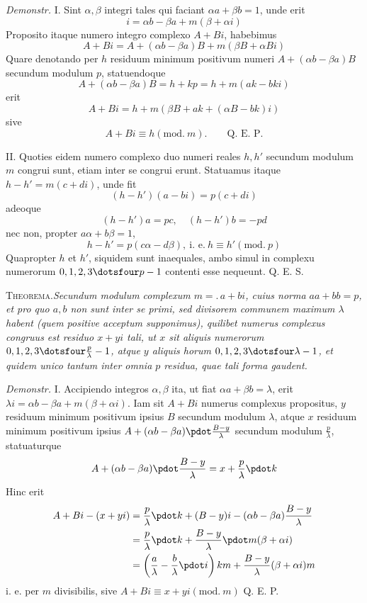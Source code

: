 %
\emph{Demonstr.} I. Sint $\alpha,\beta$ integri tales qui faciant $\alpha a+\beta b=1$, unde erit
\[
i=\alpha b-\beta a+m(\beta+\alpha i)
\]
Proposito itaque numero integro complexo $A+Bi$, habebimus
\[
A+Bi=A+(\alpha b-\beta a)B+m(\beta B+\alpha Bi)
\]
Quare denotando per $h$ residuum minimum positivum numeri $A+(\alpha b-\beta a)B$ secundum modulum $p$, statuendoque
\[
A+(\alpha b-\beta a)B=h+kp=h+m(ak-bki)
\]
erit
\[
A+Bi=h+m(\beta B+ak+(\alpha B-bk)i)
\]
sive
\[
A+Bi\equiv h(\mathrm{mod.}\ m).\qquad\text{Q. E. P.}
\]

II. Quoties eidem numero complexo duo numeri reales $h,h'$ secundum modulum $m$ congrui sunt, etiam inter se congrui erunt. Statuamus itaque $h-h'=m(c+di)$, unde fit
\[
(h-h')(a-bi)=p(c+di)
\]
adeoque
\[
(h-h')a=pc,\quad(h-h')b=-pd
\]
nec non, propter $a\alpha+b\beta=1$,
\[
h-h'=p(c\alpha-d\beta),\ \text{i. e.}\ h\equiv h'(\mathrm{mod.}\ p)
\]
Quapropter $h$ et $h'$, siquidem sunt inaequales, ambo simul in complexu numerorum $0,1,2,3\dotsfour p-1$ contenti esse nequeunt. Q. E. S.

\textsc{Theorema.}\quad\emph{Secundum modulum complexum $m=.\,a+bi$, cuius norma $aa+bb=p$, et pro quo $a,b$ non sunt inter se primi, sed divisorem communem maximum $\lambda$ habent (quem positive acceptum supponimus), quilibet numerus complexus congruus est residuo $x+yi$ tali, ut $x$ sit aliquis numerorum $0,1,2,3\dotsfour\frac p\lambda-1$, atque $y$ aliquis horum $0,1,2,3\dotsfour\lambda-1$, et quidem unico tantum inter omnia $p$ residua, quae tali forma gaudent.}

%
\emph{Demonstr.} I. Accipiendo integros $\alpha,\beta$ ita, ut fiat $\alpha a+\beta b=\lambda$, erit $\lambda i=\alpha b-\beta a+m(\beta+\alpha i)$. Iam sit $A+Bi$ numerus complexus propositus, $y$ residuum minimum positivum ipsius $B$ secundum modulum $\lambda$, atque $x$ residuum minimum positivum ipsius $A+(\alpha b-\beta a)\pdot\frac{B-y}{\lambda}$ secundum modulum $\frac p\lambda$, statuaturque
\[
A+(\alpha b-\beta a)\pdot\frac{B-y}{\lambda}=x+\frac p\lambda\pdot k
\]
Hinc erit
\[
\begin{aligned}
A+Bi-(x+yi)&=\frac p\lambda\pdot k+(B-y)i-(\alpha b-\beta a)\frac{B-y}{\lambda}\\
&=\frac p\lambda\pdot k+\frac{B-y}{\lambda}\pdot m(\beta+\alpha i)\\
&=\left(\frac a\lambda-\frac b\lambda\pdot i\right)km+\frac{B-y}{\lambda}(\beta+\alpha i)m
\end{aligned}
\]
i. e. per $m$ divisibilis, sive $A+Bi\equiv x+yi(\mathrm{mod.}\ m)$ Q. E. P.

